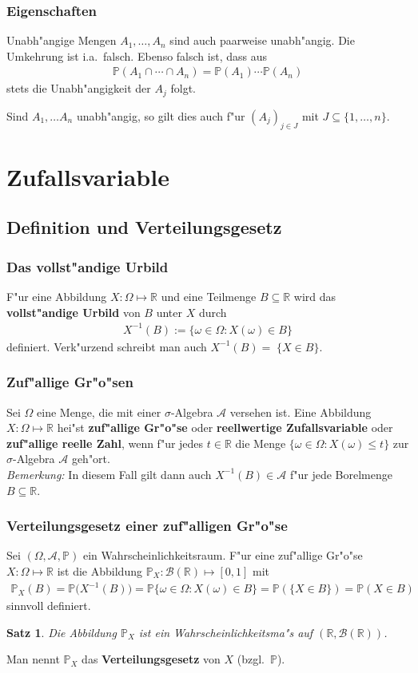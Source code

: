 \documentclass[ngerman,draft,parskip=half,twoside]{scrartcl}
\newtheorem{thm}{Satz}[section]
\newcommand*{\R}{\mathbb{R}}      %
\newcommand*{\Algeb}{\mathcal{A}}   %
\newcommand*{\BorelM}{\mathcal{B}}  %
\newcommand*{\WKM}{\mathbb{P}}      %
\begin{document}
\subsubsection{Eigenschaften}
Unabh"angige Mengen $A_1,\ldots,A_n$ sind auch paarweise unabh"angig. Die Umkehrung ist
i.a.~falsch. Ebenso falsch ist, dass aus
\begin{gather*}
  \WKM(A_{1}\cap\cdots\cap A_{n})= \WKM(A_{1})\cdots\WKM(A_{n})
\end{gather*}
stets die Unabh"angigkeit der $A_j$ folgt.

Sind $A_1,\ldots A_n$ unabh"angig, so gilt dies auch f"ur $(A_j)_{j\in J}$  mit
$J\subseteq \{1,\ldots,n\}$.

\section{Zufallsvariable}
\subsection{Definition und Verteilungsgesetz}

\subsubsection{Das vollst"andige Urbild}
F"ur eine Abbildung $X\colon\Omega\mapsto\R$ und eine Teilmenge $B\subseteq\R$ wird das
\textbf{vollst"andige Urbild} von $B$ unter $X$ durch
\begin{gather*}
  X^{-1}(B):=\{\omega\in\Omega : X(\omega)\in B\}
\end{gather*}
definiert. Verk"urzend schreibt man auch $X^{-1}(B)=\;\{X\in B\}$.
\subsubsection{Zuf"allige Gr"o"sen}
Sei $\Omega$ eine Menge, die mit einer $\sigma$-Algebra $\Algeb$ versehen ist. Eine Abbildung
$X\colon\Omega\mapsto\R$ hei"st \textbf{zuf"allige Gr"o"se} oder \textbf{reellwertige Zufallsvariable}
oder \textbf{zuf"allige reelle Zahl}, wenn f"ur jedes $t\in\R$ die Menge $\{\omega\in\Omega: X(\omega)\le t\}$
zur $\sigma$-Algebra $\Algeb$ geh"ort.\\
\textit{Bemerkung:} In diesem Fall gilt dann auch $X^{-1}(B)\in\Algeb$ f"ur jede Borelmenge $B\subseteq \R$.

\subsubsection{Verteilungsgesetz einer zuf"alligen Gr"o"se}
Sei $(\Omega,\Algeb,\WKM)$ ein Wahrscheinlichkeitsraum.
F"ur eine zuf"allige Gr"o"se $X\colon\Omega\mapsto\R$ ist die Abbildung
$\WKM_X \colon \BorelM(\R)\mapsto [0,1]$ mit
\begin{gather*}
  \WKM_X(B)=\WKM\big(X^{-1}(B)\big)=\WKM\{\omega\in\Omega : X(\omega)\in B\}=\WKM(\{X\in B\})= \WKM(X\in B)
\end{gather*}
sinnvoll definiert.
\begin{thm}
Die Abbildung $\WKM_X$ ist ein Wahrscheinlichkeitsma"s auf $(\R,\BorelM(\R))$.
\end{thm}
Man nennt $\WKM_X$ das \textbf{Verteilungsgesetz} von $X$ (bzgl.~$\WKM$).
\end{document}
